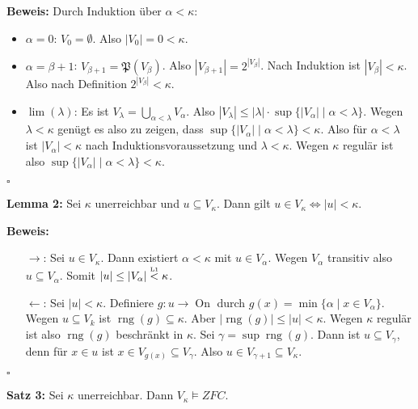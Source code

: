 \documentclass[a4paper,fontsize=11pt]{scrartcl}
\newcommand{\rng}{\operatorname{rng}}
\newcommand{\On}{\operatorname{On}}
\begin{document}
{\bf Beweis:} Durch Induktion über $\alpha<\kappa$:
\begin{itemize}
  \item $\alpha=0$: $V_0=\emptyset$. Also $|V_0|=0<\kappa$.
  \item $\alpha=\beta+1$: $V_{\beta+1}=\mathfrak{P}(V_\beta)$. Also
    $|V_{\beta+1}|=2^{|V_\beta|}$. Nach Induktion ist
    $|V_\beta|<\kappa$. Also nach Definition $2^{|V_\beta|}<\kappa$.
  \item $\lim(\lambda)$: Es ist
    $V_\lambda=\bigcup\limits_{\alpha<\lambda} V_\alpha$. Also
    $|V_\lambda|\le |\lambda|\cdot
    \sup\{|V_\alpha|\mid\alpha<\lambda\}$. Wegen $\lambda<\kappa$ genügt
    es also zu zeigen, dass
    $\sup\{|V_\alpha|\mid\alpha<\lambda\}<\kappa$. Also für
    $\alpha<\lambda$ ist $|V_\alpha|<\kappa$ nach
    Induktionsvoraussetzung und $\lambda<\kappa$. Wegen $\kappa$
    regulär ist also $\sup\{|V_\alpha|\mid\alpha<\lambda\}<\kappa$.
\end{itemize}
\hfill $\square$

{\bf Lemma 2:} Sei $\kappa$ unerreichbar und $u\subseteq
V_\kappa$. Dann gilt $u\in V_\kappa\Leftrightarrow|u|<\kappa$.

{\bf Beweis:}
\begin{itemize}
\item[$\rightarrow$:] Sei $u\in V_\kappa$. Dann existiert
  $\alpha<\kappa$ mit $u\in V_\alpha$. Wegen $V_\alpha$ transitiv also
  $u\subseteq V_\alpha$. Somit $|u|\le|V_\alpha|
  \stackrel{\mbox{\tiny L1}}{<} \kappa$.
\item[$\leftarrow$:] Sei $|u|<\kappa$. Definiere $g:u\rightarrow \On$
  durch $g(x)=\min\{\alpha\mid x\in V_\alpha\}$. Wegen $u\subseteq V_k$
  ist $\rng(g)\subseteq\kappa$. Aber $|\rng(g)|\le |u|<\kappa$. Wegen
  $\kappa$ regulär ist also $\rng(g)$ beschränkt in $\kappa$. Sei
  $\gamma=\sup \rng (g)$. Dann ist $u\subseteq V_\gamma$, denn für
  $x\in u$ ist $x\in V_{g(x)}\subseteq V_\gamma$. Also $u\in
  V_{\gamma+1}\subseteq V_\kappa$.
\end{itemize}
\hfill $\square$

{\bf Satz 3:} Sei $\kappa$ unerreichbar. Dann $V_\kappa\models ZFC$.
\end{document}
